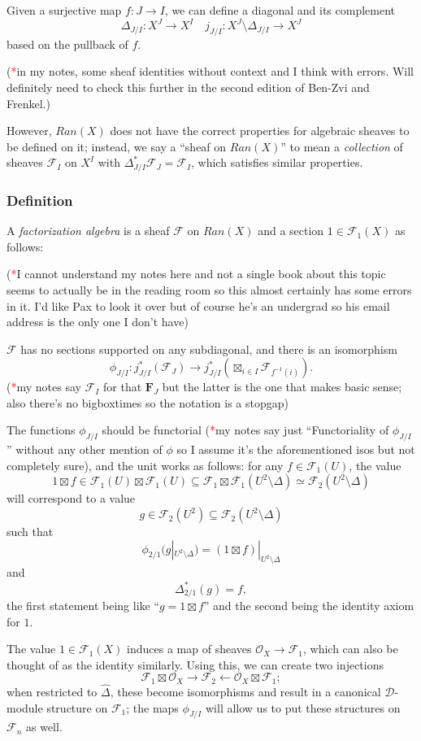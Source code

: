 \documentclass{article}
\newcommand{\FF}{\mathbold{F}}
\newcommand{\Oo}{\mathcal{O}}
\newcommand{\Dd}{\mathcal{D}}
\newcommand{\Ff}{\mathcal{F}}
\newcommand{\tk}{\textcolor{red}{*}}
\begin{document}
Given a surjective map $f: J \rightarrow I$, we can define a diagonal and its complement
\[\Delta_{J/I}: X^J \rightarrow X^I \quad j_{J/I}: X^J \setminus \Delta_{J/I} \rightarrow X^J \]
based on the pullback of $f$.

(\tk in my notes, some sheaf identities without context and I think with errors.  Will definitely need to check this further in the second edition of Ben-Zvi and Frenkel.)

However, $Ran(X)$ does not have the correct properties for algebraic sheaves to be defined on it; instead, we say a ``sheaf on $Ran(X)$'' to mean a \textit{collection} of sheaves $\Ff_I$ on $X^I$ with $\Delta_{J/I}^*\Ff_J=\Ff_I$, which satisfies similar properties.

\subsubsection{Definition}
A \textit{factorization algebra} is a sheaf $\Ff$ on $Ran(X)$ and a section $1 \in \Ff_1(X)$ as follows:

(\tk I cannot understand my notes here and not a single book about this topic seems to actually be in the reading room so this almost certainly has some errors in it.  I'd like Pax to look it over but of course he's an undergrad so his email address is the only one I don't have)

$\Ff$ has no sections supported on any subdiagonal, and there is an isomorphism
\[\phi_{J/I}: j_{J/I}^*(\Ff_J) \rightarrow j_{J/I}^*(\boxtimes_{i \in I}\Ff_{f^{-1}(i)}). \]
(\tk my notes say $\Ff_I$ for that $\FF_J$ but the latter is the one that makes basic sense; also there's no bigboxtimes so the notation is a stopgap)

The functions $\phi_{J/I}$ should be functorial (\tk my notes say just ``Functoriality of $\phi_{J/I}$'' without any other mention of $\phi$ so I assume it's the aforementioned isos but not completely sure), and the unit works as follows: for any $f \in \Ff_1(U)$, the value \[1 \boxtimes f \in \Ff_1(U) \boxtimes \Ff_1(U) \subseteq \Ff_1 \boxtimes \Ff_1(U^2 \setminus \Delta) \simeq \Ff_2(U^2 \setminus \Delta)\] will correspond to a value
\[g \in \Ff_2(U^2) \subseteq \Ff_2(U^2 \setminus \Delta) \]
such that \[\phi_{2/1}(g|_{U^2 \setminus \Delta})=(1 \boxtimes f)|_{U^2 \setminus \Delta}\] and
\[\Delta_{2/1}^*(g)=f, \]
the first statement being like ``$g=1 \boxtimes f$'' and the second being the identity axiom for $1$.

The value $1 \in \Ff_1(X)$ induces a map of sheaves $\Oo_X \rightarrow \Ff_1$, which can also be thought of as the identity similarly.  Using this, we can create two injections
\[\Ff_1 \boxtimes \Oo_X \rightarrow \Ff_2 \leftarrow \Oo_X \boxtimes \Ff_1; \]
when restricted to $\widehat{\Delta}$, these become isomorphisms and result in a canonical $\Dd$-module structure on $\Ff_1$; the maps $\phi_{J/I}$ will allow us to put these structures on $\Ff_n$ as well.
\end{document}
